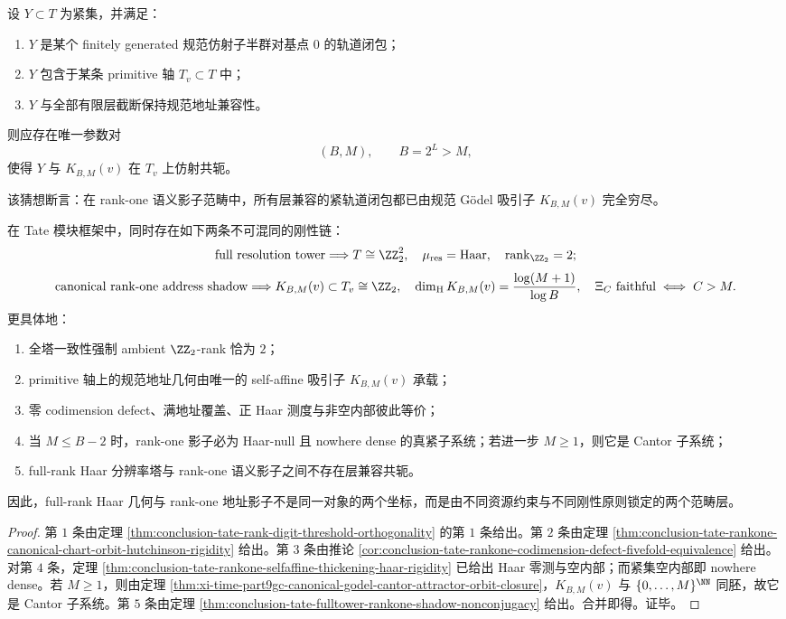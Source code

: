 \begin{conjecture}\label{conj:conclusion-tate-rankone-shadow-completeness}
设 \(Y\subset T\) 为紧集，并满足：
\begin{enumerate}
  \item \(Y\) 是某个 finitely generated 规范仿射子半群对基点 \(0\) 的轨道闭包；
  \item \(Y\) 包含于某条 primitive 轴 \(T_v\subset T\) 中；
  \item \(Y\) 与全部有限层截断保持规范地址兼容性。
\end{enumerate}
则应存在唯一参数对
\[
(B,M),
\qquad
B=2^L>M,
\]
使得 \(Y\) 与 \(K_{B,M}(v)\) 在 \(T_v\) 上仿射共轭。

该猜想断言：在 rank-one 语义影子范畴中，所有层兼容的紧轨道闭包都已由规范 Gödel 吸引子 \(K_{B,M}(v)\) 完全穷尽。
\end{conjecture}

\begin{theorem}\label{thm:conclusion-tate-resolution-shadow-bifurcation-rigidity}
在 Tate 模块框架中，同时存在如下两条不可混同的刚性链：
\[
\text{full resolution tower}
\Longrightarrow
T\cong \ZZ_2^2,\quad
\mu_{\mathrm{res}}=\text{Haar},\quad
\operatorname{rank}_{\ZZ_2}=2;
\]
\[
\text{canonical rank-one address shadow}
\Longrightarrow
K_{B,M}(v)\subset T_v\cong \ZZ_2,\quad
\dim_{\mathrm H}K_{B,M}(v)=\frac{\log(M+1)}{\log B},\quad
\Xi_C\ \text{faithful}\iff C>M.
\]
更具体地：
\begin{enumerate}
  \item 全塔一致性强制 ambient \(\ZZ_2\)-rank 恰为 \(2\)；
  \item primitive 轴上的规范地址几何由唯一的 self-affine 吸引子 \(K_{B,M}(v)\) 承载；
  \item 零 codimension defect、满地址覆盖、正 Haar 测度与非空内部彼此等价；
  \item 当 \(M\le B-2\) 时，rank-one 影子必为 Haar-null 且 nowhere dense 的真紧子系统；若进一步 \(M\ge 1\)，则它是 Cantor 子系统；
  \item full-rank Haar 分辨率塔与 rank-one 语义影子之间不存在层兼容共轭。
\end{enumerate}
因此，full-rank Haar 几何与 rank-one 地址影子不是同一对象的两个坐标，而是由不同资源约束与不同刚性原则锁定的两个范畴层。
\end{theorem}
\begin{proof}
第 \(1\) 条由定理 \ref{thm:conclusion-tate-rank-digit-threshold-orthogonality} 的第 \(1\) 条给出。第 \(2\) 条由定理 \ref{thm:conclusion-tate-rankone-canonical-chart-orbit-hutchinson-rigidity} 给出。第 \(3\) 条由推论 \ref{cor:conclusion-tate-rankone-codimension-defect-fivefold-equivalence} 给出。对第 \(4\) 条，定理 \ref{thm:conclusion-tate-rankone-selfaffine-thickening-haar-rigidity} 已给出 Haar 零测与空内部；而紧集空内部即 nowhere dense。若 \(M\ge 1\)，则由定理 \ref{thm:xi-time-part9gc-canonical-godel-cantor-attractor-orbit-closure}，\(K_{B,M}(v)\) 与 \(\{0,\dots,M\}^{\NN}\) 同胚，故它是 Cantor 子系统。第 \(5\) 条由定理 \ref{thm:conclusion-tate-fulltower-rankone-shadow-nonconjugacy} 给出。合并即得。证毕。
\end{proof}

